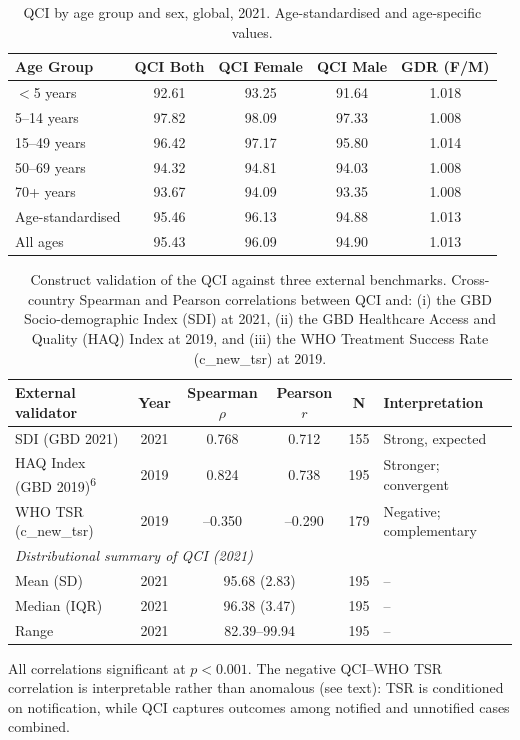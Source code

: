 \documentclass[12pt]{article}
\begin{document}
\clearpage

\begin{table}[htbp]
\centering
\caption{QCI by age group and sex, global, 2021. Age-standardised and age-specific values.}
\label{tab:table3}
\begin{tabular}{lcccc}
\toprule
Age Group & QCI Both & QCI Female & QCI Male & GDR (F/M) \\
\midrule
$<$5 years & 92.61 & 93.25 & 91.64 & 1.018 \\
5--14 years & 97.82 & 98.09 & 97.33 & 1.008 \\
15--49 years & 96.42 & 97.17 & 95.80 & 1.014 \\
50--69 years & 94.32 & 94.81 & 94.03 & 1.008 \\
70+ years & 93.67 & 94.09 & 93.35 & 1.008 \\
Age-standardised & 95.46 & 96.13 & 94.88 & 1.013 \\
All ages & 95.43 & 96.09 & 94.90 & 1.013 \\
\bottomrule
\end{tabular}
\end{table}

\begin{table}[htbp]
\centering
\caption{Construct validation of the QCI against three external benchmarks. Cross-country Spearman and Pearson correlations between QCI and: (i) the GBD Socio-demographic Index (SDI) at 2021, (ii) the GBD Healthcare Access and Quality (HAQ) Index at 2019, and (iii) the WHO Treatment Success Rate (c\_new\_tsr) at 2019.}
\label{tab:table4}
\small
\begin{tabular}{lccccl}
\toprule
External validator & Year & Spearman $\rho$ & Pearson $r$ & N & Interpretation \\
\midrule
SDI (GBD 2021) & 2021 & 0.768 & 0.712 & 155 & Strong, expected \\
HAQ Index (GBD 2019)\textsuperscript{6} & 2019 & 0.824 & 0.738 & 195 & Stronger; convergent \\
WHO TSR (c\_new\_tsr) & 2019 & --0.350 & --0.290 & 179 & Negative; complementary \\
\midrule
\multicolumn{6}{l}{\textit{Distributional summary of QCI (2021)}} \\
\midrule
Mean (SD) & 2021 & \multicolumn{2}{c}{95.68 (2.83)} & 195 & -- \\
Median (IQR) & 2021 & \multicolumn{2}{c}{96.38 (3.47)} & 195 & -- \\
Range & 2021 & \multicolumn{2}{c}{82.39--99.94} & 195 & -- \\
\bottomrule
\end{tabular}

\vspace{0.5em}
\noindent\small All correlations significant at $p < 0.001$. The negative QCI--WHO TSR correlation is interpretable rather than anomalous (see text): TSR is conditioned on notification, while QCI captures outcomes among notified and unnotified cases combined.
\end{table}
\end{document}
